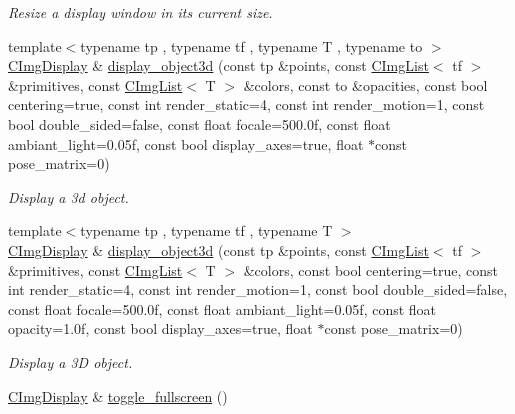 \begin{DoxyCompactItemize}
\begin{DoxyCompactList}\small\item\em Resize a display window in its current size. \item\end{DoxyCompactList}\item 
\hypertarget{structcimg__library_1_1_c_img_display_a056ef0f63c23ca5c200f50cdd8141fa5}{
{\footnotesize template$<$typename tp , typename tf , typename T , typename to $>$ }\\\hyperlink{structcimg__library_1_1_c_img_display}{CImgDisplay} \& \hyperlink{structcimg__library_1_1_c_img_display_a056ef0f63c23ca5c200f50cdd8141fa5}{display\_\-object3d} (const tp \&points, const \hyperlink{structcimg__library_1_1_c_img_list}{CImgList}$<$ tf $>$ \&primitives, const \hyperlink{structcimg__library_1_1_c_img_list}{CImgList}$<$ T $>$ \&colors, const to \&opacities, const bool centering=true, const int render\_\-static=4, const int render\_\-motion=1, const bool double\_\-sided=false, const float focale=500.0f, const float ambiant\_\-light=0.05f, const bool display\_\-axes=true, float $\ast$const pose\_\-matrix=0)}
\label{structcimg__library_1_1_c_img_display_a056ef0f63c23ca5c200f50cdd8141fa5}

\begin{DoxyCompactList}\small\item\em Display a 3d object. \item\end{DoxyCompactList}\item 
\hypertarget{structcimg__library_1_1_c_img_display_a9764e6caf609ef05d0ba9e82c4126edf}{
{\footnotesize template$<$typename tp , typename tf , typename T $>$ }\\\hyperlink{structcimg__library_1_1_c_img_display}{CImgDisplay} \& \hyperlink{structcimg__library_1_1_c_img_display_a9764e6caf609ef05d0ba9e82c4126edf}{display\_\-object3d} (const tp \&points, const \hyperlink{structcimg__library_1_1_c_img_list}{CImgList}$<$ tf $>$ \&primitives, const \hyperlink{structcimg__library_1_1_c_img_list}{CImgList}$<$ T $>$ \&colors, const bool centering=true, const int render\_\-static=4, const int render\_\-motion=1, const bool double\_\-sided=false, const float focale=500.0f, const float ambiant\_\-light=0.05f, const float opacity=1.0f, const bool display\_\-axes=true, float $\ast$const pose\_\-matrix=0)}
\label{structcimg__library_1_1_c_img_display_a9764e6caf609ef05d0ba9e82c4126edf}

\begin{DoxyCompactList}\small\item\em Display a 3D object. \item\end{DoxyCompactList}\item 
\hypertarget{structcimg__library_1_1_c_img_display_a4e6138906a037d73e90b7525861f0058}{
\hyperlink{structcimg__library_1_1_c_img_display}{CImgDisplay} \& \hyperlink{structcimg__library_1_1_c_img_display_a4e6138906a037d73e90b7525861f0058}{toggle\_\-fullscreen} ()}
\label{structcimg__library_1_1_c_img_display_a4e6138906a037d73e90b7525861f0058}


\end{DoxyCompactItemize}
